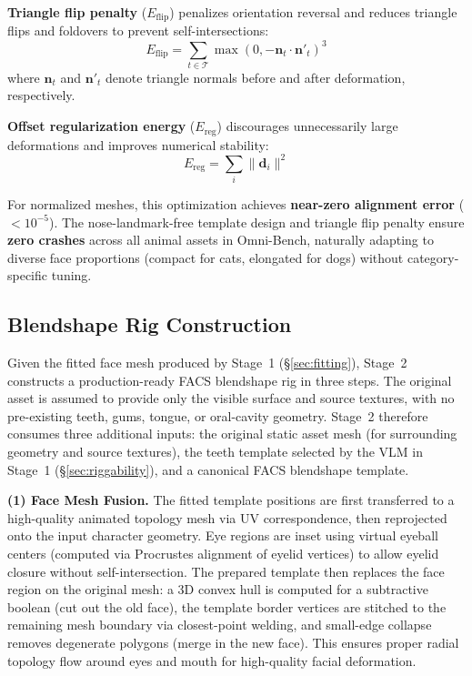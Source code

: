 \documentclass[acmtog,anonymous,review]{acmart}
\begin{document}
\textbf{Triangle flip penalty} ($E_{\text{flip}}$) penalizes orientation reversal and reduces triangle flips and foldovers to prevent self-intersections:
\begin{equation}
  E_{\text{flip}} = \sum_{t \in \mathcal{T}} \max(0, -\mathbf{n}_t \cdot \mathbf{n}'_t)^3
\end{equation}
where $\mathbf{n}_t$ and $\mathbf{n}'_t$ denote triangle normals before and after deformation, respectively.

\textbf{Offset regularization energy} ($E_{\text{reg}}$) discourages unnecessarily large deformations and improves numerical stability:
\begin{equation}
  E_{\text{reg}} = \sum_i \| \mathbf{d}_i \|^2
\end{equation}

For normalized meshes, this optimization achieves \textbf{near-zero alignment error} ($<10^{-5}$). The nose-landmark-free template design and triangle flip penalty ensure \textbf{zero crashes} across all animal assets in Omni-Bench, naturally adapting to diverse face proportions (compact for cats, elongated for dogs) without category-specific tuning.


\subsection{Blendshape Rig Construction}
\label{sec:blendshape}

Given the fitted face mesh produced by Stage~1 (\S\ref{sec:fitting}), Stage~2 constructs a production-ready FACS blendshape rig in three steps. The original asset is assumed to provide only the visible surface and source textures, with no pre-existing teeth, gums, tongue, or oral-cavity geometry. Stage~2 therefore consumes three additional inputs: the original static asset mesh (for surrounding geometry and source textures), the teeth template selected by the VLM in Stage~1 (\S\ref{sec:riggability}), and a canonical FACS blendshape template.

\textbf{(1) Face Mesh Fusion.} The fitted template positions are first transferred to a high-quality animated topology mesh via UV correspondence, then reprojected onto the input character geometry. Eye regions are inset using virtual eyeball centers (computed via Procrustes alignment of eyelid vertices) to allow eyelid closure without self-intersection. The prepared template then replaces the face region on the original mesh: a 3D convex hull is computed for a subtractive boolean (cut out the old face), the template border vertices are stitched to the remaining mesh boundary via closest-point welding, and small-edge collapse removes degenerate polygons (merge in the new face). This ensures proper radial topology flow around eyes and mouth for high-quality facial deformation.
\end{document}
